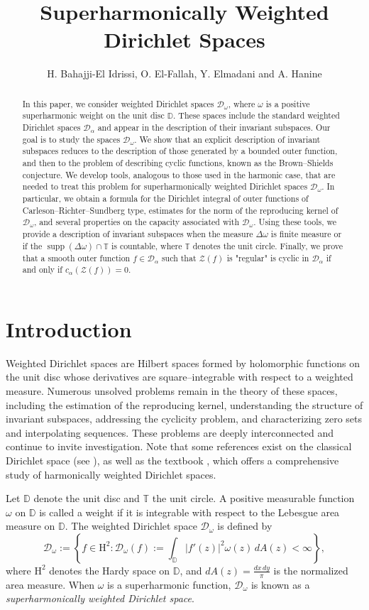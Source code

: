 \documentclass[12pt,reqno,a4paper]{amsart}
\title{Superharmonically Weighted Dirichlet Spaces}
\author[H. Bahajji-El Idrissi, O. El-Fallah, Y. Elmadani and A. Hanine]{H. Bahajji-El Idrissi, O. El-Fallah, Y. Elmadani and A. Hanine}
\newcommand{\hH}{\mathrm{H^2 }}
\newcommand\TT{\mathbb{T}}
\newcommand\DD{\mathbb{D}}
\DeclareMathOperator{\supp}{supp}
\newcommand{\cZ}{{\mathcal{Z}}}
\newcommand{\cD}{{\mathcal{D}}}
\numberwithin{equation}{section}
\begin{document}
	\maketitle
	\begin{abstract}
	In this paper, we consider weighted Dirichlet spaces $\cD_\omega$, where $\omega$ is a positive superharmonic weight on the unit disc $\DD$. These spaces include the standard weighted Dirichlet spaces $\cD_\alpha$ and appear in the description of their invariant subspaces. Our goal is to study the spaces $\cD_\omega$. We show that an explicit description of invariant subspaces reduces to the description of those generated by a bounded outer function, and then to the problem of describing cyclic functions, known as the Brown--Shields conjecture. We develop tools, analogous to those used in the harmonic case, that are needed to treat this problem for superharmonically weighted Dirichlet spaces $\cD_\omega$. In particular, we obtain a formula for the Dirichlet integral of outer functions of Carleson--Richter--Sundberg type, estimates for the norm of the reproducing kernel of $\cD_\omega$, and several properties on the capacity associated with $\cD_\omega$.   Using these tools, we provide a description of invariant subspaces when the measure $\Delta \omega$ is finite measure or if the $\supp(\Delta \omega)\cap \TT$ is countable, where $\TT$ denotes the unit circle. Finally, we prove that a smooth outer function  $f \in \cD_\alpha$ such that $\cZ (f) $ is "regular" is cyclic in $\cD_\alpha$ if and only if $c_{\alpha }(\cZ(f))= 0$.
\end{abstract}
\tableofcontents
\section{Introduction}
Weighted Dirichlet spaces are Hilbert spaces formed by holomorphic functions on the unit disc whose derivatives are square--integrable with respect to a weighted measure. 
Numerous unsolved problems remain in the theory of these spaces, including the estimation of the reproducing kernel, understanding the structure of invariant subspaces, addressing the cyclicity problem, and characterizing zero sets and interpolating sequences. These problems are deeply interconnected and continue to invite investigation. Note that some references exist on the classical Dirichlet space (see \cite{Ar, ARSW1, Ros}), as well as the textbook \cite{EKMR14}, which offers a comprehensive study of harmonically weighted Dirichlet spaces. 

Let $\mathbb{D}$ denote the unit disc and $\mathbb{T}$ the unit circle. A positive measurable function $\omega$ on $\mathbb{D}$ is called a weight if it is integrable with respect to the Lebesgue area measure on $\DD$. The weighted Dirichlet space $\mathcal{D}_{\omega}$ is defined by
\[
\mathcal{D}_{\omega}
:= \left\{ f \in \hH :
\cD_\omega(f):=\int_{\mathbb{D}} |f'(z)|^2 \omega(z)\, dA(z) < \infty \right\},
\]
where $\hH$ denotes the Hardy space on \(\mathbb{D}\), and \(dA(z) = \frac{dx \, dy}{\pi}\) is the normalized area measure. When \(\omega\) is a superharmonic function, \(\cD_\omega\) is known as a \textit{superharmonically weighted Dirichlet space}. 
\end{document}
